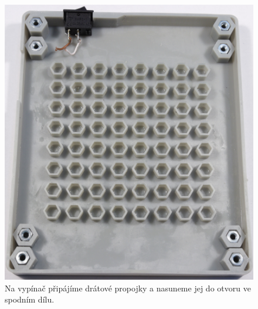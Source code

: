   \begin{figure}[!h]
    \begin{center}
      \includegraphics[scale=0.5]{prilohy/Krabicka_spodek_vypinac.jpg}
    \end{center}
    \caption[Na vypínač připájíme drátové propojky a nasuneme jej do otvoru ve spodním dílu]{Na vypínač připájíme drátové propojky a nasuneme jej do otvoru ve spodním dílu.}
  \end{figure}

